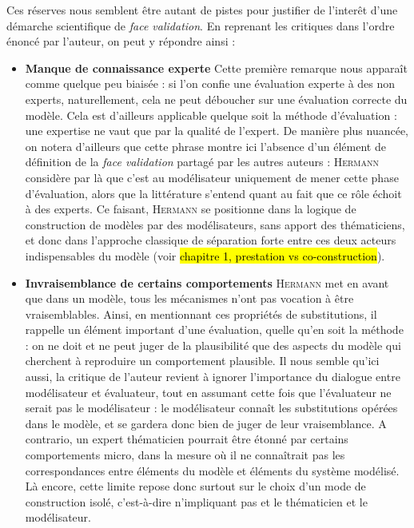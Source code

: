 Ces réserves nous semblent être autant de pistes pour justifier de l'interêt d'une démarche scientifique de \textit{face validation}. En reprenant les critiques dans l'ordre énoncé par l'auteur, on peut y répondre ainsi :
\begin{itemize}
	\item \textbf{Manque de connaissance experte}
	Cette première remarque nous apparaît comme quelque peu biaisée : si l'on confie une évaluation experte à des non experts, naturellement, cela ne peut déboucher sur une évaluation correcte du modèle.
	Cela est d'ailleurs applicable quelque soit la méthode d'évaluation : une expertise ne vaut que par la qualité de l'expert.
	De manière plus nuancée, on notera d'ailleurs que cette phrase montre ici l'absence d'un élément de définition de la \textit{face validation} partagé par les autres auteurs :
	H\textsc{ermann} considère par là que c'est au modélisateur uniquement de mener cette phase d'évaluation, alors que la littérature s'entend quant au fait que ce rôle échoit à des experts.
	Ce faisant, H\textsc{ermann} se positionne dans la logique de construction de modèles par des modélisateurs, sans apport des thématiciens, et donc dans l'approche classique de séparation forte entre ces deux acteurs indispensables du modèle (voir \hl{chapitre 1, prestation vs co-construction}).
	
	\item \textbf{Invraisemblance de certains comportements}
	H\textsc{ermann} met en avant que dans un modèle, tous les mécanismes n'ont pas vocation à être vraisemblables.
	Ainsi, en mentionnant ces \og propriétés de substitutions\fg{}, il rappelle un élément important d'une évaluation, quelle qu'en soit la méthode :
	on ne doit et ne peut juger de la plausibilité que des aspects du modèle qui cherchent à reproduire un comportement plausible.
	Il nous semble qu'ici aussi, la critique de l'auteur revient à ignorer l'importance du dialogue entre modélisateur et évaluateur, tout en assumant cette fois que l'évaluateur ne serait pas le modélisateur :
	le modélisateur connaît les \og substitutions\fg{} opérées dans le modèle, et se gardera donc bien de juger de leur vraisemblance.
	A contrario, un expert thématicien pourrait être étonné par certains comportements micro, dans la mesure où il ne connaîtrait pas les correspondances entre éléments du modèle et éléments du système modélisé.
	Là encore, cette limite repose donc surtout sur le choix d'un mode de construction isolé, c'est-à-dire n'impliquant pas et le thématicien et le modélisateur.
	

\end{itemize}
